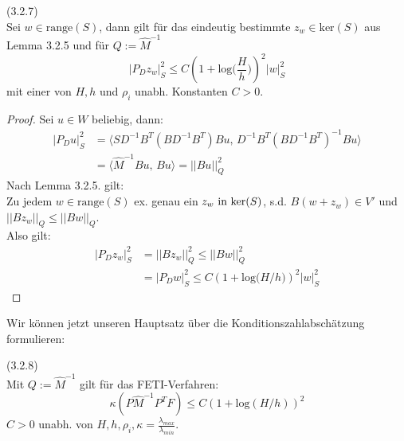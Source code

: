 \begin{lemma} (3.2.7) \\
Sei $w \in \text{range}(S)$, dann gilt für das eindeutig bestimmte $z_w \in \text{ker}(S)$ aus Lemma 3.2.5 und für $Q:= {\hat M}^{-1}$
\[ |P_Dz_w |_S^2 \leq C \left( 1 + \text{log}\big( \frac{H}{h}\big) \right)^2 |w|^2_S \]
mit einer von $H,h$ und $\rho_i$ unabh. Konstanten $C>0$. 
\end{lemma}
\begin{proof}
Sei $u\in W$ beliebig, dann:
\begin{align*}
|P_D u|^2_S &= \langle SD^{-1}B^T (BD^{-1}B^T )Bu,\, D^{-1}B^T (BD^{-1}B^T)^{-1}Bu \rangle \\
		   &= \langle {\hat M}^{-1}Bu,\, Bu \rangle =||Bu||^2_Q
\end{align*}
Nach Lemma 3.2.5. gilt:\\
Zu jedem $w \in \text{range}(S)$ ex. genau ein $z_w \textnormal{ in } \text{ker}(S)$, s.d. $B(w+z_w) \in V'$ und $|| Bz_w||_Q \leq ||Bw||_Q$.\\
Also gilt:
\begin{align*}
|P_Dz_w|^2_S &= ||Bz_w||^2_Q \leq || Bw||^2_Q \\
			&= |P_Dw|^2_S \leq C\left(1+ \text{log}\big( H/h\big) \right)^2|w|^2_S
\end{align*}
\end{proof}
Wir können jetzt unseren Hauptsatz über die Konditionszahlabschätzung formulieren:
\begin{satz}(3.2.8)\\
Mit $Q:={\hat M}^{-1}$ gilt für das FETI-Verfahren:
\[ \kappa(P{\hat M}^{-1}P^TF) \leq C(1+\text{log}(H/h))^2 \]
$C>0$ unabh. von $H,h,\rho_i, \kappa =\frac{\lambda_{max}}{\lambda_{min}}$.
\end{satz}

